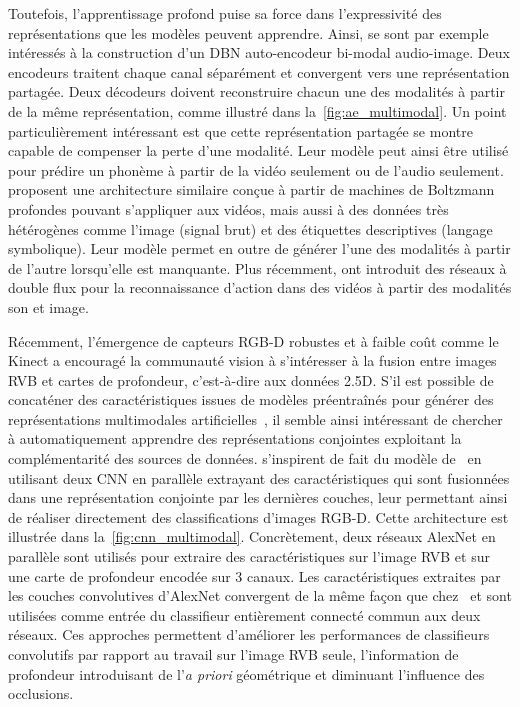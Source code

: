 Toutefois, l'apprentissage profond puise sa force dans l'expressivité des représentations que les modèles peuvent apprendre. Ainsi, \citet{ngiam_multimodal_2011} se sont par exemple intéressés à la construction d'un \gls{DBN} auto-encodeur bi-modal audio-image. Deux encodeurs traitent chaque canal séparément et convergent vers une représentation partagée. Deux décodeurs doivent reconstruire chacun une des modalités à partir de la même représentation, comme illustré dans la~\cref{fig:ae_multimodal}. Un point particulièrement intéressant est que cette représentation partagée se montre capable de compenser la perte d'une modalité. Leur modèle peut ainsi être utilisé pour prédire un phonème à partir de la vidéo seulement ou de l'audio seulement.
\citet{srivastava_multimodal_2014} proposent une architecture similaire conçue à partir de machines de Boltzmann profondes pouvant s'appliquer aux vidéos, mais aussi à des données très hétérogènes comme l'image (signal brut) et des étiquettes descriptives (langage symbolique). Leur modèle permet en outre de générer l'une des modalités à partir de l'autre lorsqu'elle est manquante. Plus récemment, \citet{simonyan_two-stream_2014} ont introduit des réseaux à double flux pour la reconnaissance d'action dans des vidéos à partir des modalités son et image.

Récemment, l'émergence de capteurs \gls{RGB-D} robustes et à faible coût comme le Kinect a encouragé la communauté vision à s'intéresser à la fusion entre images \gls{RVB} et cartes de profondeur, c'est-à-dire aux données \num{2,5}D. S'il est possible de concaténer des caractéristiques issues de modèles préentraînés pour générer des représentations multimodales artificielles~\cite{schwarz_rgb-d_2015,lagrange_benchmarking_2015}, il semble ainsi intéressant de chercher à automatiquement apprendre des représentations conjointes exploitant la complémentarité des sources de données. \citet{eitel_multimodal_2015,guo_two-stream_2016,song_combining_2017} s'inspirent de fait du modèle de~\citet{ngiam_multimodal_2011} en utilisant deux \gls{CNN} en parallèle extrayant des caractéristiques qui sont fusionnées dans une représentation conjointe par les dernières couches, leur permettant ainsi de réaliser directement des classifications d'images \gls{RGB-D}. Cette architecture est illustrée dans la~\cref{fig:cnn_multimodal}. Concrètement, deux réseaux \gls{AlexNet} en parallèle sont utilisés pour extraire des caractéristiques sur l'image \gls{RVB} et sur une carte de profondeur encodée sur 3 canaux. Les caractéristiques extraites par les couches convolutives d'AlexNet convergent de la même façon que chez~\citet{ngiam_multimodal_2011} et sont utilisées comme entrée du classifieur entièrement connecté commun aux deux réseaux. Ces approches permettent d'améliorer les performances de classifieurs convolutifs par rapport au travail sur l'image \gls{RVB} seule, l'information de profondeur introduisant de l'\emph{a priori} géométrique et diminuant l'influence des occlusions.

